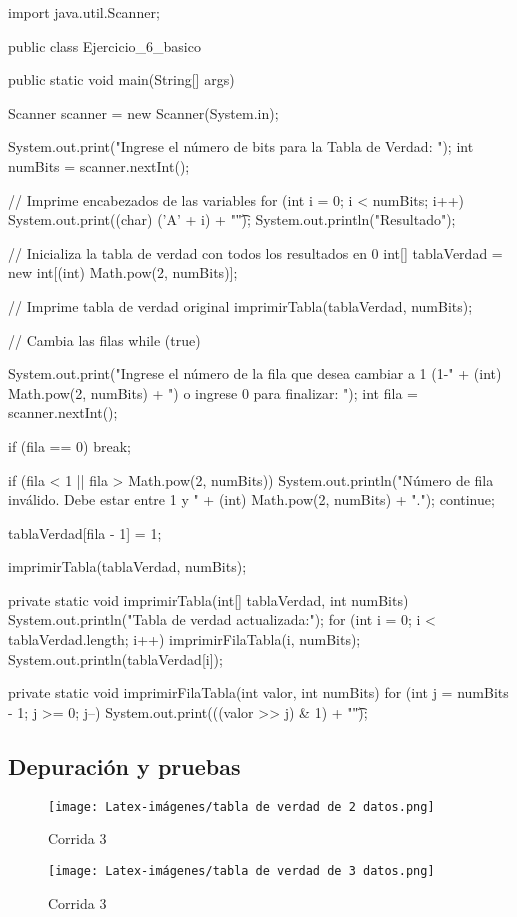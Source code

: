 \begin{javaCode}
import java.util.Scanner;

public class Ejercicio_6_basico {
    public static void main(String[] args) {
        Scanner scanner = new Scanner(System.in);
        
        System.out.print("Ingrese el número de bits para la Tabla de Verdad: ");
        int numBits = scanner.nextInt();
        
        // Imprime encabezados de las variables
        for (int i = 0; i < numBits; i++) {
            System.out.print((char) ('A' + i) + "\t");
        }
        System.out.println("Resultado");
        
        // Inicializa la tabla de verdad con todos los resultados en 0
        int[] tablaVerdad = new int[(int) Math.pow(2, numBits)];
        
        // Imprime tabla de verdad original
        imprimirTabla(tablaVerdad, numBits);
        
        // Cambia las filas
        while (true) {
            System.out.print("Ingrese el número de la fila que desea cambiar a 1 (1-" + (int) Math.pow(2, numBits) + ") o ingrese 0 para finalizar: ");
            int fila = scanner.nextInt();
            
            if (fila == 0) {
                break;
            }
            
            if (fila < 1 || fila > Math.pow(2, numBits)) {
                System.out.println("Número de fila inválido. Debe estar entre 1 y " + (int) Math.pow(2, numBits) + ".");
                continue;
            }
            
            tablaVerdad[fila - 1] = 1;
            
            imprimirTabla(tablaVerdad, numBits);
        }
    }

    private static void imprimirTabla(int[] tablaVerdad, int numBits) {
        System.out.println("Tabla de verdad actualizada:");
        for (int i = 0; i < tablaVerdad.length; i++) {
            imprimirFilaTabla(i, numBits);
            System.out.println(tablaVerdad[i]);
        }
    }

    private static void imprimirFilaTabla(int valor, int numBits) {
        for (int j = numBits - 1; j >= 0; j--) {
            System.out.print(((valor >> j) & 1) + "\t");
        }
    }
}
\end{javaCode}

\subsection{Depuración y pruebas}

\begin {figure}[h!]
\centerline{\texttt{[image: Latex-imágenes/tabla de verdad de 2 datos.png]}}
\caption{Corrida 3}
\label{fig}
\end {figure}

\begin {figure}[h!]
\centerline{\texttt{[image: Latex-imágenes/tabla de verdad de 3 datos.png]}}
\caption{Corrida 3}
\label{fig}
\end {figure}